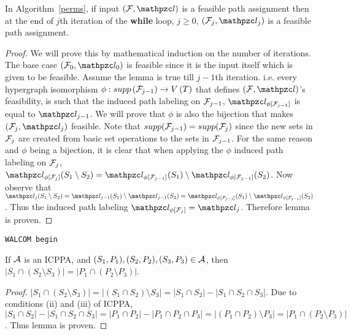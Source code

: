 \begin{lemma}
  \label{lem:feasible}
  In Algorithm~\ref{perms}, if input $(\cF, \cl)$ is a feasible path
  assignment then at the end of $j$th iteration of the {\bf while}
  loop, $j \ge 0$, $(\cF_j, \cl_j)$ is a feasible path assignment.
\end{lemma}
\begin{proof}%
  We will prove this by mathematical induction on the number of
  iterations. The base case $(\cF_0, \cl_0)$ is feasible since it is
  the input itself which is given to be feasible. Assume the lemma is
  true till $j-1$th iteration. i.e. every hypergraph isomorphism
  $\phi: supp\left({\cal F}_{j-1}\right) \rightarrow V\left(T \right)$ that
  defines $(\cF, \cl)$'s feasibility, is such that the induced path
  labeling on ${\cal F}_{j-1}$, $\cl_{\phi[{\cF_{j-1}}]}$ is equal to
  $\cl_{j-1}$. We will prove that $\phi$ is also the bijection that
  makes $(\cF_j, \cl_j)$ feasible. Note that $supp({\cal F}_{j-1}) =
  supp({\cal F}_{j})$ since the new sets in ${\cal F}_j$ are created from basic
  set operations to the sets in ${\cal F}_{j-1}$. For the same reason and
  $\phi$ being a bijection, it is clear that when applying the $\phi$
  induced path labeling on ${\cal F}_j$, $ \cl_{\phi[{\cF_{j}}]}(S_1
  \setminus S_2) = \cl_{\phi[{\cF_{j-1}}]}(S_1) \setminus
  \cl_{\phi[{\cF_{j-1}}]}(S_2)$. Now observe that $ \cl_j(S_1
  \setminus S_2) = \cl_{j-1}(S_1) \setminus \cl_{j-1}(S_2) =
  \cl_{\phi[{\cF_{j-1}}]}(S_1) \setminus
  \cl_{\phi[{\cF_{j-1}}]}(S_2)$. Thus the induced path labeling
  $\cl_{\phi[{\cF_{j}}]} = \cl_{j}$. Therefore lemma is proven.  %
\end{proof}


{\tt WALCOM begin}


\begin{lemma}
  \label{lem:setminuscard}
  If ${\cal A}$ is an ICPPA, and $(S_1, P_1),(S_2, P_2),(S_3, P_3) \in
  {\cal A}$, then $|S_1 \cap (S_2 \setminus S_3)| = |P_1 \cap (P_2
  \setminus P_3)|$.
\end{lemma}
\begin{proof}
  $|S_1 \cap (S_2 \setminus S_3)| = |(S_1 \cap S_2) \setminus S_3| =
  |S_1 \cap S_2| - |S_1 \cap S_2 \cap S_3|$. Due to conditions (ii)
  and (iii) of ICPPA, $|S_1 \cap S_2| - |S_1 \cap S_2 \cap S_3| = |P_1
  \cap P_2| - |P_1 \cap P_2 \cap P_3| = |(P_1 \cap P_2) \setminus P_3|
  = |P_1 \cap (P_2 \setminus P_3)|$. Thus lemma is proven. %
\end{proof}


